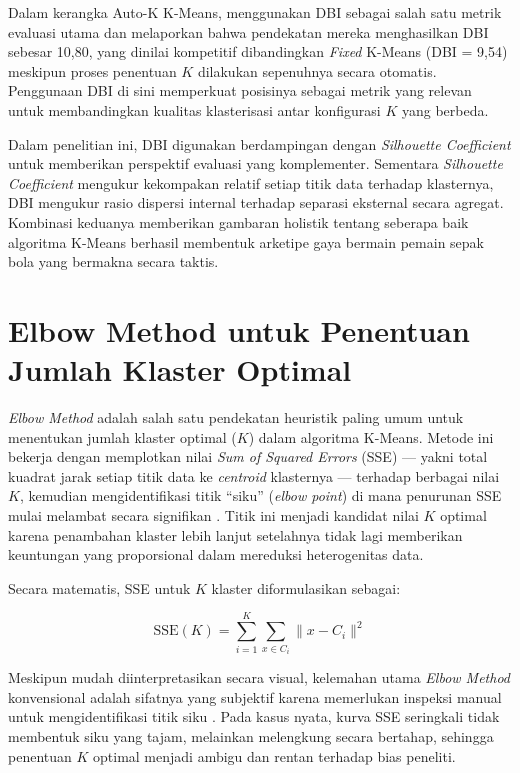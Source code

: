 Dalam kerangka Auto-K K-Means, \textcite{udhayasuriyan2025} menggunakan DBI sebagai salah satu metrik evaluasi utama dan melaporkan bahwa pendekatan mereka menghasilkan DBI sebesar 10,80, yang dinilai kompetitif dibandingkan \emph{Fixed} K-Means (DBI = 9,54) meskipun proses penentuan $K$ dilakukan sepenuhnya secara otomatis. Penggunaan DBI di sini memperkuat posisinya sebagai metrik yang relevan untuk membandingkan kualitas klasterisasi antar konfigurasi $K$ yang berbeda.

Dalam penelitian ini, DBI digunakan berdampingan dengan \emph{Silhouette Coefficient} untuk memberikan perspektif evaluasi yang komplementer. Sementara \emph{Silhouette Coefficient} mengukur kekompakan relatif setiap titik data terhadap klasternya, DBI mengukur rasio dispersi internal terhadap separasi eksternal secara agregat. Kombinasi keduanya memberikan gambaran holistik tentang seberapa baik algoritma K-Means berhasil membentuk arketipe gaya bermain pemain sepak bola yang bermakna secara taktis.

\section{Elbow Method untuk Penentuan Jumlah Klaster Optimal}
\label{sec:elbow}

\emph{Elbow Method} adalah salah satu pendekatan heuristik paling umum untuk menentukan jumlah klaster optimal ($K$) dalam algoritma K-Means. Metode ini bekerja dengan memplotkan nilai \emph{Sum of Squared Errors} (SSE) --- yakni total kuadrat jarak setiap titik data ke \emph{centroid} klasternya --- terhadap berbagai nilai $K$, kemudian mengidentifikasi titik ``siku'' (\emph{elbow point}) di mana penurunan SSE mulai melambat secara signifikan \parencite{udhayasuriyan2025}. Titik ini menjadi kandidat nilai $K$ optimal karena penambahan klaster lebih lanjut setelahnya tidak lagi memberikan keuntungan yang proporsional dalam mereduksi heterogenitas data.

Secara matematis, SSE untuk $K$ klaster diformulasikan sebagai:

\begin{equation}
  \mathrm{SSE}(K) = \sum_{i=1}^{K} \sum_{x \in C_i} \lVert x - C_i \rVert^2
  \label{eq:sse}
\end{equation}

Meskipun mudah diinterpretasikan secara visual, kelemahan utama \emph{Elbow Method} konvensional adalah sifatnya yang subjektif karena memerlukan inspeksi manual untuk mengidentifikasi titik siku \parencite{udhayasuriyan2025}. Pada kasus nyata, kurva SSE seringkali tidak membentuk siku yang tajam, melainkan melengkung secara bertahap, sehingga penentuan $K$ optimal menjadi ambigu dan rentan terhadap bias peneliti.


